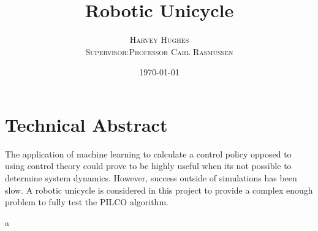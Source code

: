 \documentclass[twoside,twocolumn,12pt]{article}
\title{Robotic Unicycle} %
\author{%
\textsc{Harvey Hughes} \\
\textsc{Supervisor:Professor Carl Rasmussen} \\
}
\date{\today} %
\begin{document}
\maketitle


\section*{Technical Abstract}
The application of machine learning to calculate a control policy opposed to using control theory could prove to be highly useful when its not possible to determine system dynamics. However, success outside of simulations has been slow. A robotic unicycle is considered in this project to provide a complex enough problem to fully test the PILCO algorithm.
\newline


\clearpage
a
\onecolumn

\tableofcontents

\twocolumn
\end{document}
